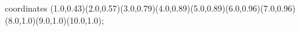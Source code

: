 					coordinates { (1.0,0.43)(2.0,0.57)(3.0,0.79)(4.0,0.89)(5.0,0.89)(6.0,0.96)(7.0,0.96)(8.0,1.0)(9.0,1.0)(10.0,1.0)};